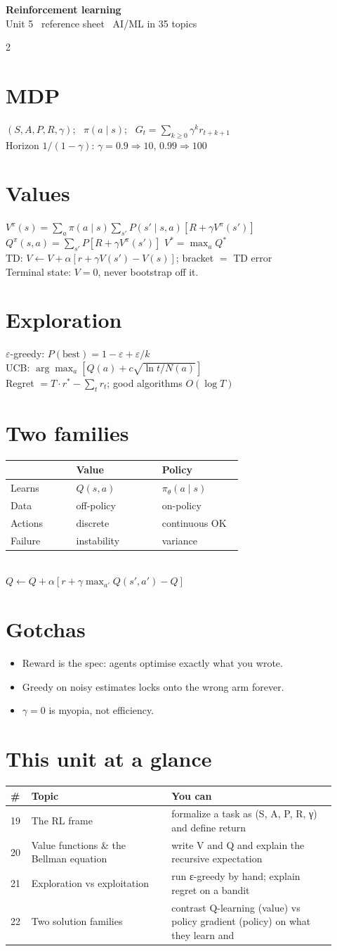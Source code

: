 \documentclass[11pt,a4paper]{article}
\newcommand{\sect}[1]{\section*{#1}}
\newcommand{\hd}[2]{\begin{center}{\large\bfseries #1}\\[-0.1em]{\small\color{gray}#2}\end{center}\vspace{-0.6em}}
\begin{document}
\hd{Reinforcement learning}{Unit 5 \textperiodcentered\ reference sheet \textperiodcentered\ AI/ML in 35 topics}
\begin{multicols}{2}
\normalsize

\sect{MDP}
$(S,A,P,R,\gamma)$; \ $\pi(a\mid s)$; \ $G_t=\sum_{k\ge0}\gamma^k r_{t+k+1}$\\
Horizon $1/(1-\gamma)$: $\gamma{=}0.9\Rightarrow10$, $0.99\Rightarrow100$

\sect{Values}
$V^\pi(s)=\sum_a\pi(a\mid s)\sum_{s'}P(s'\mid s,a)[R+\gamma V^\pi(s')]$\\
$Q^\pi(s,a)=\sum_{s'}P[R+\gamma V^\pi(s')]$ \quad $V^*=\max_a Q^*$\\
TD: $V\leftarrow V+\alpha[r+\gamma V(s')-V(s)]$; bracket $=$ TD error\\
Terminal state: $V=0$, never bootstrap off it.

\sect{Exploration}
$\varepsilon$-greedy: $P(\text{best})=1-\varepsilon+\varepsilon/k$\\
UCB: $\arg\max_a\left[Q(a)+c\sqrt{\ln t/N(a)}\right]$\\
Regret $=T\cdot r^*-\sum_t r_t$; good algorithms $O(\log T)$

\sect{Two families}
\begin{tabular}{@{}p{0.26\linewidth}p{0.34\linewidth}p{0.32\linewidth}@{}}
\toprule
 & Value & Policy\\
\midrule
Learns & $Q(s,a)$ & $\pi_\theta(a\mid s)$\\
Data & off-policy & on-policy\\
Actions & discrete & continuous OK\\
Failure & instability & variance\\
\bottomrule
\end{tabular}\\
$Q\leftarrow Q+\alpha[r+\gamma\max_{a'}Q(s',a')-Q]$

\sect{Gotchas}
\begin{itemize}
\item Reward is the spec: agents optimise exactly what you wrote.
\item Greedy on noisy estimates locks onto the wrong arm forever.
\item $\gamma{=}0$ is myopia, not efficiency.
\end{itemize}

\sect{This unit at a glance}
\begin{tabular}{@{}p{0.05\linewidth}p{0.40\linewidth}p{0.47\linewidth}@{}}
\toprule
\# & Topic & You can\\
\midrule
19 & The RL frame & formalize a task as (S, A, P, R, γ) and define return\\
20 & Value functions \& the Bellman equation & write V and Q and explain the recursive expectation\\
21 & Exploration vs exploitation & run ε-greedy by hand; explain regret on a bandit\\
22 & Two solution families & contrast Q-learning (value) vs policy gradient (policy) on what they learn and\\
\bottomrule
\end{tabular}


\end{multicols}
\end{document}
